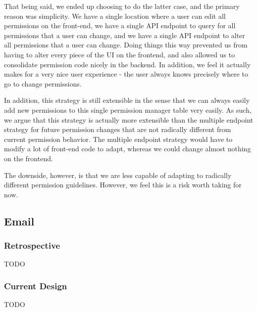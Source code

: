 \documentclass[12pt]{article}
\begin{document}
That being said, we ended up choosing to do the latter case, and the primary reason was simplicity. We have a single location where a user can edit all permissions on the front-end, we have a single API endpoint to query for all permissions that a user can change, and we have a single API endpoint to alter all permissions that a user can change. Doing things this way prevented us from having to alter every piece of the UI on the frontend, and also allowed us to consolidate permission code nicely in the backend. In addition, we feel it actually makes for a very nice user experience - the user always knows precisely where to go to change permissions. 

In addition, this strategy is still extensible in the sense that we can always easily add new permissions to this single permission manager table very easily. As such, we argue that this strategy is actually more extensible than the multiple endpoint strategy for future permission changes that are not radically different from current permission behavior. The multiple endpoint strategy would have to modify a lot of front-end code to adapt, whereas we could change almost nothing on the frontend. 

The downside, however, is that we are less capable of adapting to radically different permission guidelines. However, we feel this is a risk worth taking for now. 

\subsection{Email}
\subsubsection{Retrospective}
{\huge TODO}

\subsubsection{Current Design}
{\huge TODO}
\end{document}
